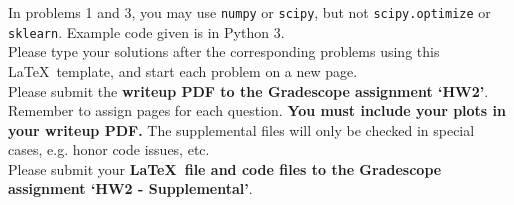 \documentclass[submit]{harvardml}
\begin{document}
In problems 1 and 3, you may use \texttt{numpy} or \texttt{scipy}, but
not \texttt{scipy.optimize} or \texttt{sklearn}. Example code given is
in Python 3.\\

Please type your solutions after the corresponding problems using this
\LaTeX\ template, and start each problem on a new page.\\

Please submit the \textbf{writeup PDF to the Gradescope assignment `HW2'}. Remember to assign pages for each question.  \textbf{You must include your plots in your writeup PDF. } The supplemental files will only be checked in special cases, e.g. honor code issues, etc. \\

Please submit your \textbf{\LaTeX\ file and code files to the Gradescope assignment `HW2 - Supplemental'}. 

\end{document}
